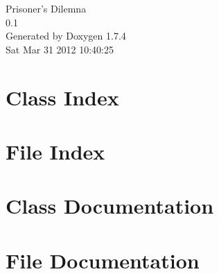 \documentclass[a4paper]{book}
\begin{document}
\hypersetup{pageanchor=false}
\begin{titlepage}
\vspace*{7cm}
\begin{center}
{\Large Prisoner's Dilemna \\[1ex]\large 0.1 }\\
\vspace*{1cm}
{\large Generated by Doxygen 1.7.4}\\
\vspace*{0.5cm}
{\small Sat Mar 31 2012 10:40:25}\\
\end{center}
\end{titlepage}
\clearemptydoublepage
{}
\tableofcontents
\clearemptydoublepage
{}
\hypersetup{pageanchor=true}
\chapter{Class Index}

\chapter{File Index}

\chapter{Class Documentation}









\chapter{File Documentation}


























\printindex
\end{document}
